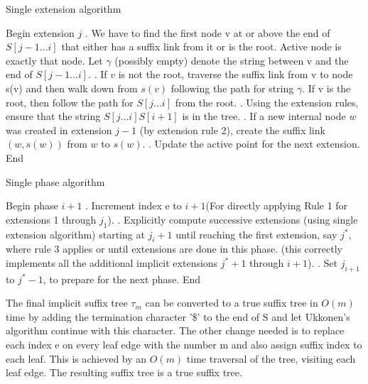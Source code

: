 \documentclass[11pt,a4paper]{article}
\begin{document}
\begin{algorithm}[H]
\caption*{Single extension algorithm}
\label{seapsuedocode}
\begin{algorithmic}
\STATE Begin {extension $j$} 
. We have to find the first node v at or above the end of $S[j-1...i]$ that either has a suffix link from it or is the root. Active node is exactly that node. Let $\gamma$ (possibly empty) denote the string between v and the end of $S[j-1...i]$.
. If $v$ is not the root, traverse the suffix link from v to node s(v) and then walk down from $s(v)$ following the path for string $\gamma$. If v is the root, then follow the path for $S[j...i]$ from the root.
. Using the extension rules, ensure that the string $S[j...i]S[i+1]$ is in the tree.
. If a new internal node $w$ was created in extension $j-1$ (by extension rule 2), create the suffix link $(w,s(w))$ from $w$ to $s(w)$.
. Update the active point for the next extension.
\STATE End
\end{algorithmic}
\end{algorithm}

\begin{algorithm}[H]
\caption*{Single phase algorithm}
\label{spapsuedocode}
\begin{algorithmic}
\STATE Begin {phase $i+1$}
. Increment index e to $i+1$(For directly applying Rule 1 for extensions 1 through $j_1$).
. Explicitly compute successive extensions (using single extension algorithm) starting at $j_i+1$ until reaching the first extension, say $j^*$, where rule 3 applies or until extensions are done in this phase. (this correctly implements all the additional implicit extensions $j^*+1$ through $i+1$).
. Set $j_{i+1}$ to $j^*-1$, to prepare for the next phase.
\STATE End
\end{algorithmic}
\end{algorithm}

The final implicit suffix tree $\tau_m$ can be converted to a true suffix tree in $O(m)$ time by adding the termination character '\$' to the end of S and let Ukkonen's algorithm continue with this character. The other change needed is to replace each index e on every leaf edge with the number m and also assign suffix index to each leaf. This is achieved by an $O(m)$ time traversal of the tree, visiting each leaf edge. The resulting suffix tree is a true suffix tree.
\end{document}
